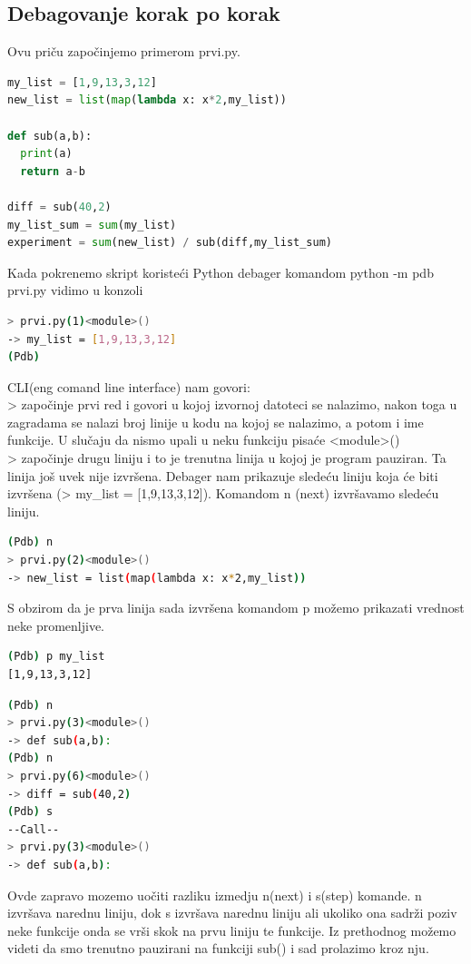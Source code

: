 \documentclass[a4paper]{article}
\begin{document}
\subsection{Debagovanje korak po korak}
Ovu priču započinjemo primerom prvi.py.
\begin{lstlisting}[language = python, caption = {prvi.py}]
my_list = [1,9,13,3,12]
new_list = list(map(lambda x: x*2,my_list))

def sub(a,b):
  print(a)
  return a-b
  
diff = sub(40,2)
my_list_sum = sum(my_list)
experiment = sum(new_list) / sub(diff,my_list_sum)
\end{lstlisting}
Kada pokrenemo skript koristeći Python debager komandom python -m pdb prvi.py vidimo u konzoli
\begin{lstlisting}[language = bash, caption={ispis}]
> prvi.py(1)<module>()
-> my_list = [1,9,13,3,12]
(Pdb)
\end{lstlisting}
CLI(eng comand line interface) nam govori:\\
> započinje prvi red i govori u kojoj izvornoj datoteci se nalazimo, nakon toga u zagradama se nalazi broj linije u kodu na kojoj se nalazimo, a potom i ime funkcije. U slučaju da nismo upali u neku funkciju pisaće <module>()\\
\textendash>  započinje drugu liniju i to je trenutna linija u kojoj je program pauziran. Ta linija još uvek nije izvršena. Debager nam prikazuje sledeću liniju koja će biti izvršena 
(\textendash> my\_list = [1,9,13,3,12]).
Komandom n (next) izvršavamo sledeću liniju.
\begin{lstlisting}[language = bash, caption={ispis}]
(Pdb) n
> prvi.py(2)<module>()
-> new_list = list(map(lambda x: x*2,my_list))
\end{lstlisting}
S obzirom da je prva linija sada izvršena komandom p možemo prikazati vrednost neke
 promenljive.
\begin{lstlisting}[language = bash, caption={ispis}]
(Pdb) p my_list
[1,9,13,3,12]
\end{lstlisting}
\begin{lstlisting}[language = bash, caption={ispis}]
(Pdb) n
> prvi.py(3)<module>()
-> def sub(a,b):
(Pdb) n
> prvi.py(6)<module>()
-> diff = sub(40,2)
(Pdb) s
--Call--
> prvi.py(3)<module>()
-> def sub(a,b):
\end{lstlisting}
Ovde zapravo mozemo uočiti razliku izmedju n(next) i s(step) komande. n izvršava narednu liniju, dok s izvršava narednu liniju ali ukoliko ona sadrži poziv neke funkcije onda se vrši skok na prvu liniju te funkcije. Iz prethodnog možemo videti da smo trenutno pauzirani na funkciji sub() i sad prolazimo kroz nju.
\end{document}
